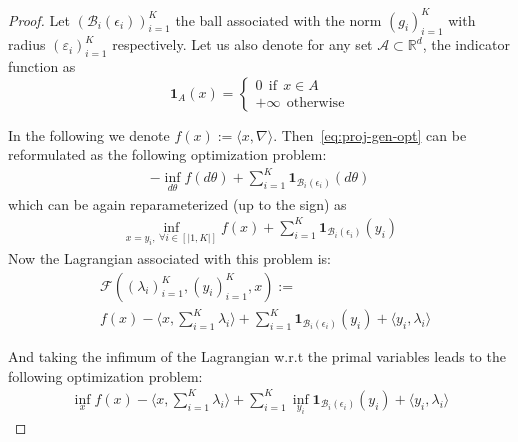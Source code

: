 \begin{proof}
Let $(\mathcal{B}_i(\epsilon_i))_{i=1}^K$ the ball associated with the norm $(g_i)_{i=1}^K$ with radius $(\varepsilon_i)_{i=1}^K$ respectively. Let us also denote for any set $\mathcal{A}\subset\mathbb{R}^d$, the indicator function as 
$$\bm{1}_{A}(x)=\begin{cases} 
          0 ~~\text{if}~~x\in A\\
          +\infty ~~\text{otherwise}
       \end{cases}$$

In the following we denote $f(x):=\langle x, \nabla\rangle$. Then~\eqref{eq:proj-gen-opt} can be reformulated as the following optimization problem:
\begin{align*}
    -\inf_{d\theta} f(d\theta) +\sum_{i=1}^K \bm{1}_{\mathcal{B}_i(\epsilon_i)}(
d\theta)
\end{align*}
which can be again reparameterized (up to the sign) as 
\begin{align*}
    \inf_{x=y_i, ~ \forall i\in[|1,K|]} f(x) +\sum_{i=1}^K \bm{1}_{\mathcal{B}_i(\epsilon_i)}(y_i)
\end{align*}
Now the Lagrangian associated with this problem is:
\begin{align*}
    &\mathcal{F}((\lambda_i)_{i=1}^{K}, (y_i)_{i=1}^K, x):= \\
    & f(x) - \langle x,\sum_{i=1}^K\lambda_i\rangle  +\sum_{i=1}^K \bm{1}_{\mathcal{B}_i(\epsilon_i)}(y_i) + \langle y_i, \lambda_i\rangle 
\end{align*}

And taking the infimum of the Lagrangian w.r.t the primal variables leads to the following optimization problem:
\begin{align*}
    \inf_{x} f(x) - \langle x,\sum_{i=1}^K\lambda_i\rangle + \sum_{i=1}^K \inf_{y_i} \bm{1}_{\mathcal{B}_i(\epsilon_i)}(y_i) + \langle y_i, \lambda_i\rangle 
\end{align*}


\end{proof}
